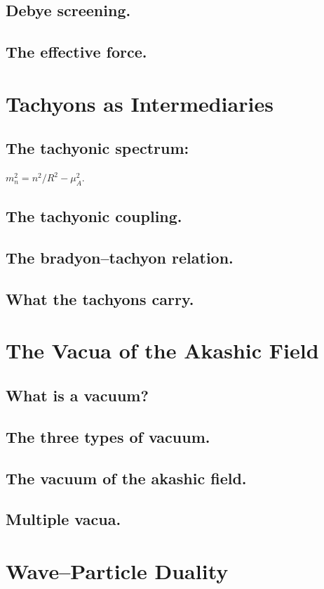 \documentclass[11pt,a4paper]{article}
\begin{document}
\subsection{Debye screening.}
\subsection{The effective force.}

\section{Tachyons as Intermediaries}
\subsection{The tachyonic spectrum:} $m_n^2 = n^2/R^2 - \mu_A^2$.
\subsection{The tachyonic coupling.}
\subsection{The bradyon--tachyon relation.}
\subsection{What the tachyons carry.}

\section{The Vacua of the Akashic Field}
\subsection{What is a vacuum?}
\subsection{The three types of vacuum.}
\subsection{The vacuum of the akashic field.}
\subsection{Multiple vacua.}

\section{Wave--Particle Duality}
\end{document}
